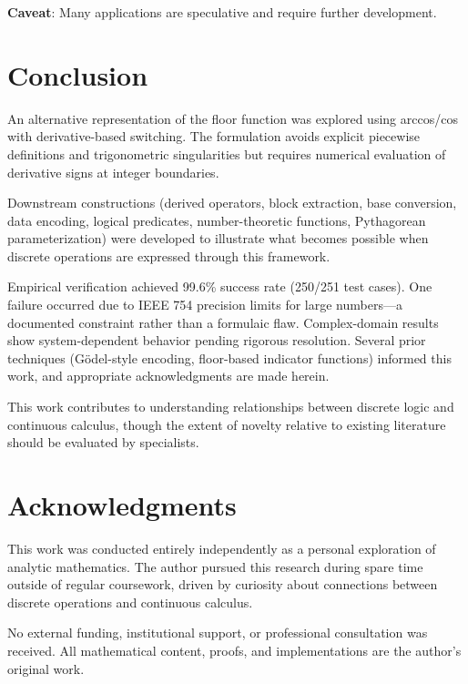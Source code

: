 \documentclass[12pt, a4paper]{article}
\theoremstyle{note}
\begin{document}
\textbf{Caveat}: Many applications are speculative and require further development.

\section{Conclusion}

An alternative representation of the floor function was explored using arccos/cos with derivative-based switching. The formulation avoids explicit piecewise definitions and trigonometric singularities but requires numerical evaluation of derivative signs at integer boundaries.

Downstream constructions (derived operators, block extraction, base conversion, data encoding, logical predicates, number-theoretic functions, Pythagorean parameterization) were developed to illustrate what becomes possible when discrete operations are expressed through this framework.

Empirical verification achieved 99.6\% success rate (250/251 test cases). One failure occurred due to IEEE 754 precision limits for large numbers—a documented constraint rather than a formulaic flaw. Complex-domain results show system-dependent behavior pending rigorous resolution. Several prior techniques (Gödel-style encoding, floor-based indicator functions) informed this work, and appropriate acknowledgments are made herein.

This work contributes to understanding relationships between discrete logic and continuous calculus, though the extent of novelty relative to existing literature should be evaluated by specialists.

\section*{Acknowledgments}

This work was conducted entirely independently as a personal exploration of analytic mathematics. The author pursued this research during spare time outside of regular coursework, driven by curiosity about connections between discrete operations and continuous calculus.

No external funding, institutional support, or professional consultation was received. All mathematical content, proofs, and implementations are the author's original work.
\end{document}
